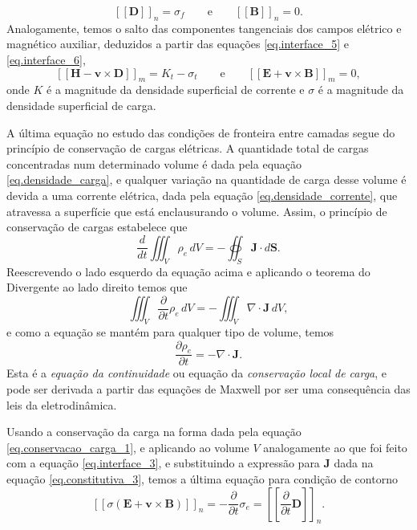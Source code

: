 \begin{equation}
\left[\left[\mathbf{D}\right]\right]_n=\sigma_f\qquad\text{e}\qquad\left[\left[\mathbf{B}\right]\right]_n=0.
\end{equation}  
Analogamente, temos o salto das componentes tangenciais dos campos el\'etrico e magn\'etico auxiliar, deduzidos a partir das equa\c{c}\~oes \ref{eq.interface_5} e \ref{eq.interface_6},
\begin{equation}
\left[\left[\mathbf{H}-\mathbf{v}\times\mathbf{D}\right]\right]_m=K_t-\sigma_t\qquad\text{e}\qquad\left[\left[\mathbf{E}+\mathbf{v}\times\mathbf{B}\right]\right]_m=0,
\end{equation}
onde $K$ \'e a magnitude da densidade superficial de corrente e $\sigma$ \'e a magnitude da densidade superficial de carga.

A \'ultima equa\c{c}\~ao no estudo das condi\c{c}\~oes de fronteira entre camadas segue do princ\'ipio de conserva\c{c}\~ao de cargas el\'etricas. A quantidade total de cargas concentradas num determinado volume \'e dada pela equa\c{c}\~ao \ref{eq.densidade_carga}, e qualquer varia\c{c}\~ao na quantidade de carga desse volume \'e devida a uma corrente el\'etrica, dada pela equa\c{c}\~ao \ref{eq.densidade_corrente}, que atravessa a superf\'icie que est\'a enclausurando o volume. Assim,  o princ\'ipio de conserva\c{c}\~ao de cargas estabelece que
\begin{equation}\label{eq.conservacao_carga_1}
\frac{d}{dt}\iiint_V\rho_e\,dV=-\oiint_S\mathbf{J}\cdot d\mathbf{S}.
\end{equation}
Reescrevendo o lado esquerdo da equa\c{c}\~ao acima e aplicando o teorema do Divergente ao lado direito temos que
\begin{equation*}
\iiint_V\frac{\partial}{\partial t}\rho_e\,dV=-\iiint_V\nabla\cdot\mathbf{J}\,dV,
\end{equation*}
e como a equa\c{c}\~ao se mant\'em para qualquer tipo de volume, temos
\begin{equation*}
\frac{\partial\rho_e}{\partial t}=-\nabla\cdot\mathbf{J}.
\end{equation*}
Esta \'e a \textit{equa\c{c}\~ao da continuidade} ou equa\c{c}\~ao da \textit{conserva\c{c}\~ao local de carga}, e pode ser derivada a partir das equa\c{c}\~oes de Maxwell por ser uma consequ\^encia das leis da eletrodin\^amica. 

Usando a conserva\c{c}\~ao da carga na forma dada pela equa\c{c}\~ao \ref{eq.conservacao_carga_1}, e aplicando ao volume $V$ analogamente ao que foi feito com a equa\c{c}\~ao \ref{eq.interface_3}, e substituindo a express\~ao para $\mathbf{J}$ dada na equa\c{c}\~ao \ref{eq.constitutiva_3}, temos a \'ultima equa\c{c}\~ao para condi\c{c}\~ao de contorno
\begin{equation*}
\left[\left[\sigma(\mathbf{E}+\mathbf{v}\times\mathbf{B})\right]\right]_n=-\frac{\partial}{\partial t}\sigma_e=\left[\left[\frac{\partial}{\partial t}\mathbf{D}\right]\right]_n.
\end{equation*}

